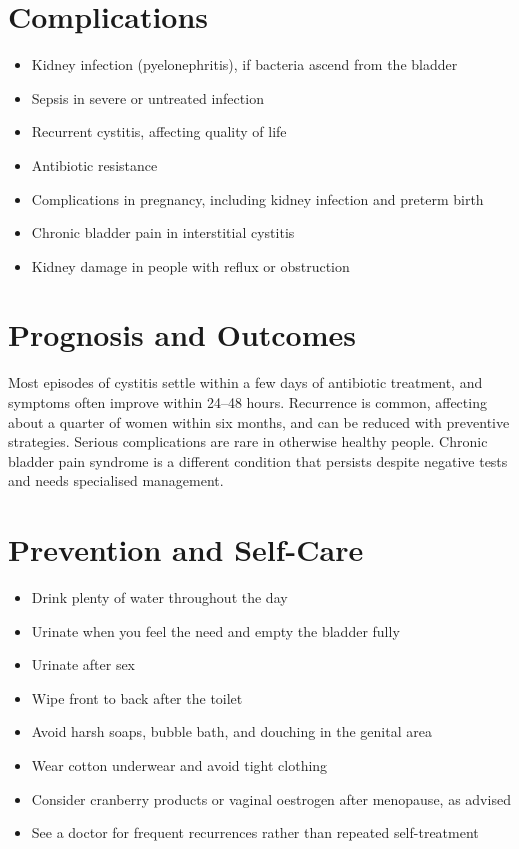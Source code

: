 \section*{Complications}
\begin{itemize}
    \item Kidney infection (pyelonephritis), if bacteria ascend from the bladder
    \item Sepsis in severe or untreated infection
    \item Recurrent cystitis, affecting quality of life
    \item Antibiotic resistance
    \item Complications in pregnancy, including kidney infection and preterm birth
    \item Chronic bladder pain in interstitial cystitis
    \item Kidney damage in people with reflux or obstruction
\end{itemize}

\section*{Prognosis and Outcomes}
Most episodes of cystitis settle within a few days of antibiotic treatment, and symptoms often improve within 24--48 hours. Recurrence is common, affecting about a quarter of women within six months, and can be reduced with preventive strategies. Serious complications are rare in otherwise healthy people. Chronic bladder pain syndrome is a different condition that persists despite negative tests and needs specialised management.

\section*{Prevention and Self-Care}
\begin{itemize}
    \item Drink plenty of water throughout the day
    \item Urinate when you feel the need and empty the bladder fully
    \item Urinate after sex
    \item Wipe front to back after the toilet
    \item Avoid harsh soaps, bubble bath, and douching in the genital area
    \item Wear cotton underwear and avoid tight clothing
    \item Consider cranberry products or vaginal oestrogen after menopause, as advised
    \item See a doctor for frequent recurrences rather than repeated self-treatment
\end{itemize}

